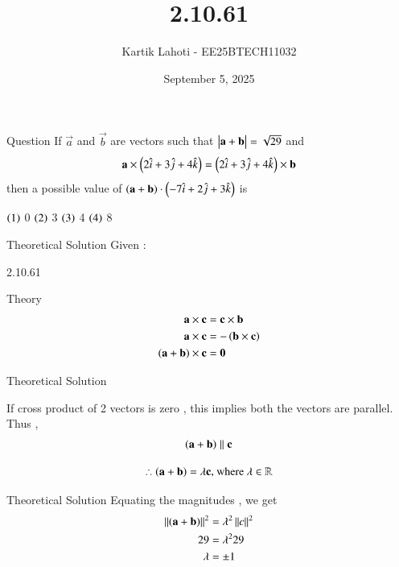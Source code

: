 \documentclass{beamer}
\title %
{2.10.61}
\date{September 5, 2025}
\author 
{Kartik Lahoti - EE25BTECH11032}
\begin{document}
\frame{\titlepage}
\begin{frame}{Question}
If $\vec{a}$ and $\vec{b}$ are vectors such that $\begin{vmatrix}\mathbf{a} + \mathbf{b}\end{vmatrix} = \sqrt{29}$ and
\begin{align*}
    \mathbf{a} \times \left(2\hat{i} + 3\hat{j} + 4\hat{k}\right) = \left(2\hat{i} + 3\hat{j} + 4\hat{k}\right) \times \mathbf{b}
\end{align*}
then a possible value of $\left(\mathbf{a}+\mathbf{b}\right)\cdot\left(-7\hat{i} + 2\hat{j} + 3\hat{k}\right)$ is 


  $\left(1\right)$ 0 \hspace{2cm} $\left(2\right)$ 3 \hspace{2cm} $\left(3\right)$ 4 \hspace{2cm} $\left(4\right)$ 8
\end{frame}



\begin{frame}{Theoretical Solution}
Given :
\begin{table}[H]
    \centering
    
    \caption{2.10.61}
    \label{tab:placeholder_1}
\end{table}
\end{frame}

\begin{frame}{Theory}
\begin{align}
    \mathbf{a} \times \mathbf{c} &= \mathbf{c} \times \mathbf{b}\\
    \mathbf{a} \times \mathbf{c} &= - \left(\mathbf{b} \times \mathbf{c}\right) \\
    \left(\mathbf{a} + \mathbf{b}\right) \times \mathbf{c} &= \mathbf{0}  
\end{align}
\end{frame}
\begin{frame}{Theoretical Solution}

If cross product of 2 vectors is zero ,  this implies both the vectors are parallel. 
Thus , 
\begin{align}
    \left(\mathbf{a} + \mathbf{b}\right) \parallel \mathbf{c} 
\end{align}

\begin{align}
   \therefore\left(\mathbf{a} + \mathbf{b}\right) = \lambda\mathbf{c}  \text{, where } \lambda \in \mathbb{R}
\end{align}

\end{frame}

\begin{frame}{Theoretical Solution}
Equating the magnitudes , we get 
\begin{align}
    \left\lVert\left(\mathbf{a} + \mathbf{b}\right)\right\rVert^2 &= \lambda^2 \left\lVert c\right\rVert^2 \\
    29 &= \lambda^2 29 \\ 
    \lambda &= \pm 1 
 \end{align}
\end{frame}
\end{document}
